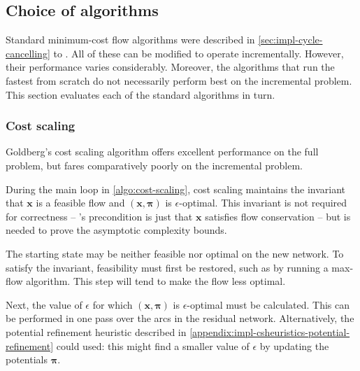 
\subsection{Choice of algorithms} \label{sec:impl-incremental-choice}
Standard minimum-cost flow algorithms were described in \cref{sec:impl-cycle-cancelling} to . All of these can be modified to operate incrementally. However, their performance varies considerably. Moreover, the algorithms that run the fastest from scratch do not necessarily perform best on the incremental problem. This section evaluates each of the standard algorithms in turn.

\subsubsection{Cost scaling} 
Goldberg's cost scaling algorithm offers excellent performance on the full problem, but fares comparatively poorly on the incremental problem. 

During the main loop in \cref{algo:cost-scaling}, cost scaling maintains the invariant that $\mathbf{x}$ is a feasible flow and $\left(\mathbf{x},\boldsymbol{\pi}\right)$ is $\epsilon$-optimal. This invariant is not required for correctness -- 's precondition is just that $\mathbf{x}$ satisfies flow conservation -- but is needed to prove the asymptotic complexity bounds.

The starting state may be neither feasible nor optimal on the new network. To satisfy the invariant, feasibility must first be restored, such as by running a max-flow algorithm\footnotemark. This step will tend to make the flow less optimal.

Next, the value of $\epsilon$ for which $\left(\mathbf{x},\boldsymbol{\pi}\right)$ is $\epsilon$-optimal must be calculated. This can be performed in one pass over the arcs in the residual network\footnotemark. Alternatively, the potential refinement heuristic described in \cref{appendix:impl-csheuristics-potential-refinement} could used: this might find a smaller value of $\epsilon$ by updating the potentials $\boldsymbol{\pi}$.

